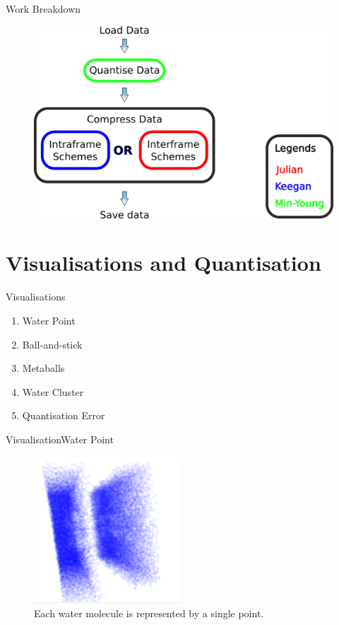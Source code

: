 \documentclass{beamer}
\begin{document}
\begin{frame}{Work Breakdown}
  \begin{figure}
    \includegraphics[width=1.0\textwidth]{legends.png}
  \end{figure}
\end{frame}


\section{Visualisations and Quantisation}

\begin{frame}{Visualisations}
\begin{enumerate}
  \item Water Point
  \item Ball-and-stick
  \item Metaballs
  \item Water Cluster
  \item Quantisation Error
\end{enumerate}
\end{frame}

\begin{frame}{Visualisation}{Water Point}
\begin{figure}
  \centering
  \includegraphics[width=55mm]{min-images/water-point.png}
  \caption{Each water molecule is represented by a single point.}
\end{figure}
\end{frame}
\end{document}
